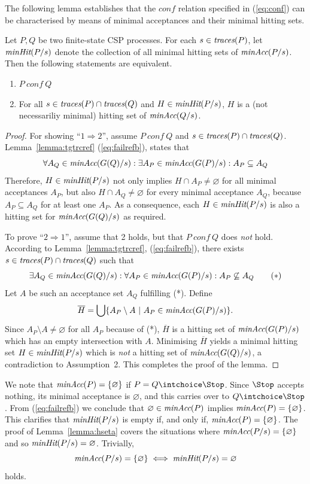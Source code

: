 The following lemma establishes that the $conf$ relation specified in
(\ref{eq:conf}) can be characterised by means of minimal acceptances and
their minimal hitting sets.
%
\begin{lemma}
\label{lemma:hseta}
Let $P, Q$ be two finite-state CSP processes.
For each $s\in\text{\it traces}(P)$,
let $\text{\it minHit}(P/s)$ denote the
collection of all minimal hitting sets of $\text{\it minAcc}(P/s)$.
Then the following statements are equivalent.
\begin{enumerate}
\item $P\ conf\ Q$

\item For all $s\in\text{\it traces}(P)\cap \text{\it traces}(Q)$ and $H \in  \text{\it minHit}(P/s)$, $H$ is
a (not necessariliy minimal) hitting set of $\text{\it minAcc}(Q/s)$.
\end{enumerate}
\end{lemma}
\begin{proof}
For showing ``$1 \Rightarrow 2$'', assume   $P\ conf\ Q$ and $s\in\text{\it traces}(P)\cap
\text{\it traces}(Q)$. Lemma~\ref{lemma:tgtrcref} (\ref{eq:failrefb}), states that
\[
\forall A_Q\in\text{\it minAcc}(G(Q)/s):
\exists A_P\in\text{\it minAcc}(G(P)/s): A_P\subseteq A_Q
\]
Therefore, $H \in  \text{\it minHit}(P/s)$ not only implies $H\cap A_P\neq\varnothing$
for all minimal acceptances $A_P$, but also $H\cap A_Q\neq\varnothing$ for
every minimal acceptance $A_Q$, because $A_P\subseteq A_Q$ for at least one
$A_P$. As a consequence, each $H \in \text{\it minHit}(P/s)$ is also a hitting set for
$\text{\it minAcc}(G(Q)/s)$ as required.

To prove ``$2 \Rightarrow 1$'', assume that 2 holds, but that $P\ conf\ Q$
does {\it not} hold. According to Lemma~\ref{lemma:tgtrcref},
(\ref{eq:failrefb}), there exists $s\in\text{\it traces}(P)\cap \text{\it traces}(Q)$ such that
\[
\exists A_Q\in\text{\it minAcc}(G(Q)/s): \forall A_P\in\text{\it minAcc}(G(P)/s): A_P\not\subseteq A_Q
\qquad (*)
\]
Let $A$ be such an acceptance set $A_Q$ fulfilling (*).
Define
\[
\overline H = \bigcup\{ A_P \setminus A~|~A_P\in\text{\it minAcc}(G(P)/s) \}.
\]
Since $A_P \setminus A \neq\varnothing$ for all $A_P$ because of (*),
$\overline H$ is a hitting set of $\text{\it minAcc}(G(P)/s)$ which has an  empty
intersection with $A$.
Minimising $\overline H$ yields   a minimal hitting set $H\in
\text{\it minHit}(P/s)$ which is {\it not} a hitting set of $\text{\it minAcc}(G(Q)/s)$, a
contradiction to Assumption~2. This completes the proof of the lemma. \xbox
\end{proof}
%
We note that $\text{\it minAcc}(P) = \{ \varnothing \}$ if $P = Q\intchoice \Stop$.
Since $\Stop$ accepts nothing, its minimal acceptance is $\varnothing$, and
this carries over to $Q\intchoice \Stop$.  From (\ref{eq:failrefb}) we
conclude that $\varnothing\in\text{\it minAcc}(P)$ implies $\text{\it minAcc}(P) = \{
\varnothing \}$. This clarifies that $\text{\it minHit}(P/s)$ is empty if, and only
if, $\text{\it minAcc}(P) = \{ \varnothing \}$. The proof of Lemma~\ref{lemma:hseta}
covers the situations where $\text{\it minAcc}(P/s) = \{ \varnothing \}$ and so
$\text{\it minHit}(P/s) = \varnothing$. Trivially,
\begin{equation}
\label{eq:minhitminaccempty}
\text{\it minAcc}(P/s) = \{ \varnothing \} \iff \text{\it minHit}(P/s) = \varnothing
\end{equation}
holds.

